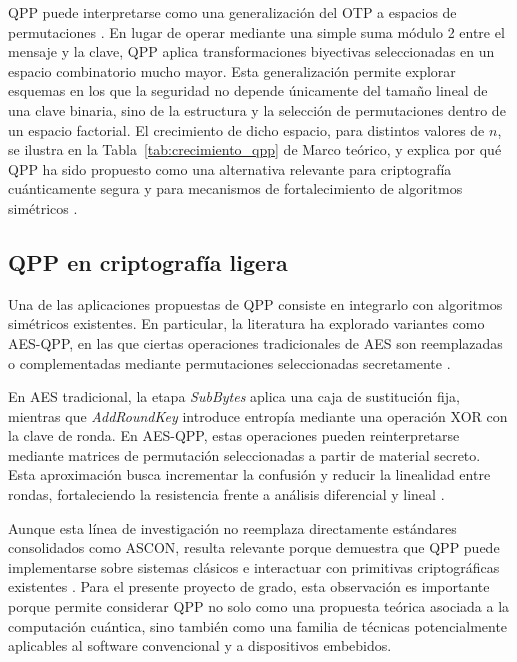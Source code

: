 QPP puede interpretarse como una generalización del OTP a espacios de permutaciones \cite{Kuang2021QuantumPad,Kuang2022QuantumCryptography}. En lugar de operar mediante una simple suma módulo 2 entre el mensaje y la clave, QPP aplica transformaciones biyectivas seleccionadas en un espacio combinatorio mucho mayor. Esta generalización permite explorar esquemas en los que la seguridad no depende únicamente del tamaño lineal de una clave binaria, sino de la estructura y la selección de permutaciones dentro de un espacio factorial. El crecimiento de dicho espacio, para distintos valores de $n$, se ilustra en la Tabla~\ref{tab:crecimiento_qpp} de Marco teórico, y explica por qué QPP ha sido propuesto como una alternativa relevante para criptografía cuánticamente segura y para mecanismos de fortalecimiento de algoritmos simétricos \cite{Kuang2025QuantumCryptography}.

\subsection{QPP en criptografía ligera}

Una de las aplicaciones propuestas de QPP consiste en integrarlo con algoritmos simétricos existentes. En particular, la literatura ha explorado variantes como AES-QPP, en las que ciertas operaciones tradicionales de AES son reemplazadas o complementadas mediante permutaciones seleccionadas secretamente \cite{Kuang2021QuantumPad}.

En AES tradicional, la etapa \textit{SubBytes} aplica una caja de sustitución fija, mientras que \textit{AddRoundKey} introduce entropía mediante una operación XOR con la clave de ronda. En AES-QPP, estas operaciones pueden reinterpretarse mediante matrices de permutación seleccionadas a partir de material secreto. Esta aproximación busca incrementar la confusión y reducir la linealidad entre rondas, fortaleciendo la resistencia frente a análisis diferencial y lineal \cite{Kuang2022QuantumSystems,Perepechaenko2023QuantumComputers}.

Aunque esta línea de investigación no reemplaza directamente estándares consolidados como ASCON, resulta relevante porque demuestra que QPP puede implementarse sobre sistemas clásicos e interactuar con primitivas criptográficas existentes \cite{Lou2022BenchmarkPad}. Para el presente proyecto de grado, esta observación es importante porque permite considerar QPP no solo como una propuesta teórica asociada a la computación cuántica, sino también como una familia de técnicas potencialmente aplicables al software convencional y a dispositivos embebidos.

